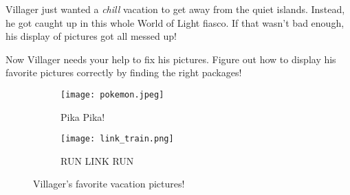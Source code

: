 
Villager just wanted a \textit{chill} vacation to get away from the quiet islands. Instead, he got caught up in this whole World of Light fiasco. If that wasn't bad enough, his display of pictures got all messed up! 

Now Villager needs your help to fix his pictures. Figure out how to display his favorite pictures correctly by finding the right packages!

\begin{figure}[h]
  \begin{subfigure}[t]{0.5\textwidth}
    \centering
    \texttt{[image: pokemon.jpeg]}
    \caption{Pika Pika!}
  \end{subfigure}
  \begin{subfigure}[t]{0.33\textwidth}
    \centering
    \texttt{[image: link\_train.png]}
    \caption{RUN LINK RUN}
  \end{subfigure}
  \caption{Villager's favorite vacation pictures!}
\end{figure}


